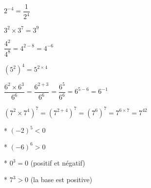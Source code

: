 \documentclass[../Cours.tex]{subfiles}
\begin{document}
\begin{listedexemples}
\begin{multicols}{2}
    \item $2^{-4} = \dfrac{1}{2^4}$
    \item $3^2 \times 3^7 = 3^9$
    \item $\dfrac{4^2}{4^8} = 4^{2-8} = 4^{-6}$
    \item $\left(5^2\right)^4 = 5^{2 \times 4} $
\end{multicols}
    \item $\dfrac{6^2 \times 6^3}{6^6} = \dfrac{6^{2+3}}{6^6} = \dfrac{6^5}{6^6} = 6^{5-6} = 6^{-1}$
    \item $\left( 7^2 \times 7^4 \right)^7 = \left(7^{2+4}\right)^7 = \left(7^6\right)^7 = 7^{6 \times 7} = 7^{42}$
\end{listedexemples}



\begin{listedexemples}
\begin{multicols}{2}
    \item[*] $(-2)^5 < 0$
    \item[*] $(-6)^6 > 0$
    \item[*] $0^3 = 0$ (positif et négatif)
    \item[*] $7^3 > 0$ (la base est positive)
\end{multicols}
\end{listedexemples}
\end{document}
